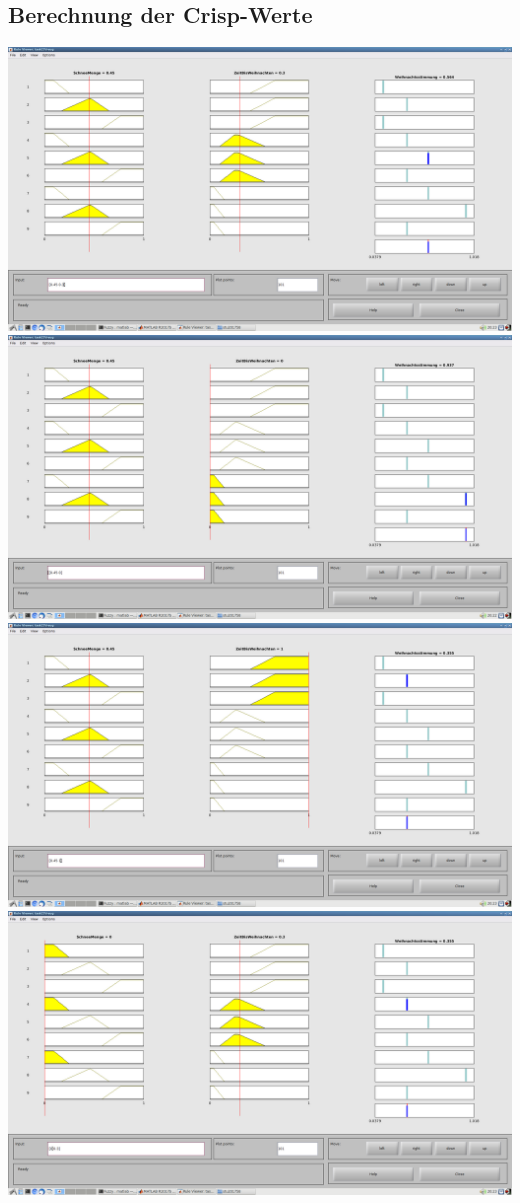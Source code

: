 \subsection*{Berechnung der Crisp-Werte}
\includegraphics[width=\textwidth]{part/screenshots/fuzzy-17d-0,45-0,3}
\includegraphics[width=\textwidth]{part/screenshots/fuzzy-17d-0,45-0}
\includegraphics[width=\textwidth]{part/screenshots/fuzzy-17d-0,45-1}
\includegraphics[width=\textwidth]{part/screenshots/fuzzy-17d-0-0,3}
